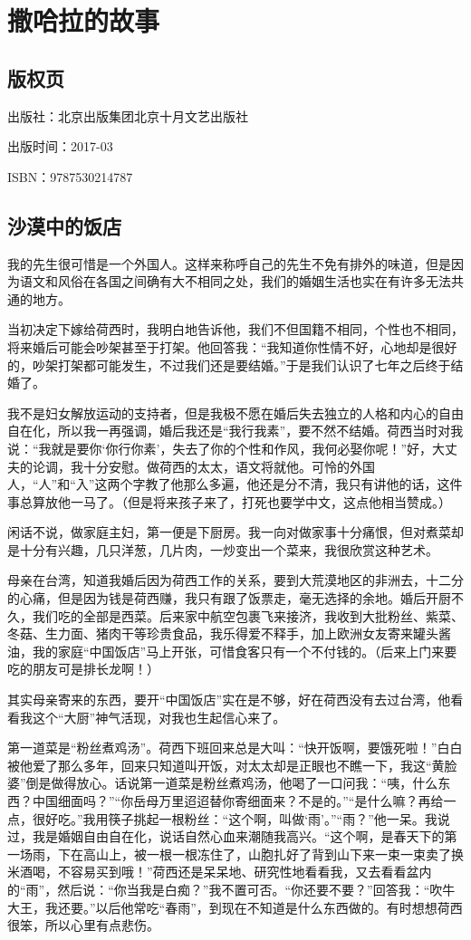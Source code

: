 
\section{撒哈拉的故事}

\subsection{版权页}
\par 出版社：北京出版集团北京十月文艺出版社
\par 出版时间：2017-03
\par ISBN：9787530214787

\subsection{沙漠中的饭店}
\par 我的先生很可惜是一个外国人。这样来称呼自己的先生不免有排外的味道，但是因为语文和风俗在各国之间确有大不相同之处，我们的婚姻生活也实在有许多无法共通的地方。
\par 当初决定下嫁给荷西时，我明白地告诉他，我们不但国籍不相同，个性也不相同，将来婚后可能会吵架甚至于打架。他回答我：“我知道你性情不好，心地却是很好的，吵架打架都可能发生，不过我们还是要结婚。”于是我们认识了七年之后终于结婚了。
\par 我不是妇女解放运动的支持者，但是我极不愿在婚后失去独立的人格和内心的自由自在化，所以我一再强调，婚后我还是“我行我素”，要不然不结婚。荷西当时对我说：“我就是要你‘你行你素’，失去了你的个性和作风，我何必娶你呢！”好，大丈夫的论调，我十分安慰。做荷西的太太，语文将就他。可怜的外国人，“人”和“入”这两个字教了他那么多遍，他还是分不清，我只有讲他的话，这件事总算放他一马了。（但是将来孩子来了，打死也要学中文，这点他相当赞成。）
\par 闲话不说，做家庭主妇，第一便是下厨房。我一向对做家事十分痛恨，但对煮菜却是十分有兴趣，几只洋葱，几片肉，一炒变出一个菜来，我很欣赏这种艺术。
\par 母亲在台湾，知道我婚后因为荷西工作的关系，要到大荒漠地区的非洲去，十二分的心痛，但是因为钱是荷西赚，我只有跟了饭票走，毫无选择的余地。婚后开厨不久，我们吃的全部是西菜。后来家中航空包裹飞来接济，我收到大批粉丝、紫菜、冬菇、生力面、猪肉干等珍贵食品，我乐得爱不释手，加上欧洲女友寄来罐头酱油，我的家庭“中国饭店”马上开张，可惜食客只有一个不付钱的。（后来上门来要吃的朋友可是排长龙啊！）
\par 其实母亲寄来的东西，要开“中国饭店”实在是不够，好在荷西没有去过台湾，他看看我这个“大厨”神气活现，对我也生起信心来了。
\par 第一道菜是“粉丝煮鸡汤”。荷西下班回来总是大叫：“快开饭啊，要饿死啦！”白白被他爱了那么多年，回来只知道叫开饭，对太太却是正眼也不瞧一下，我这“黄脸婆”倒是做得放心。话说第一道菜是粉丝煮鸡汤，他喝了一口问我：“咦，什么东西？中国细面吗？”“你岳母万里迢迢替你寄细面来？不是的。”“是什么嘛？再给一点，很好吃。”我用筷子挑起一根粉丝：“这个啊，叫做‘雨’。”“雨？”他一呆。我说过，我是婚姻自由自在化，说话自然心血来潮随我高兴。“这个啊，是春天下的第一场雨，下在高山上，被一根一根冻住了，山胞扎好了背到山下来一束一束卖了换米酒喝，不容易买到哦！”荷西还是呆呆地、研究性地看看我，又去看看盆内的“雨”，然后说：“你当我是白痴？”我不置可否。“你还要不要？”回答我：“吹牛大王，我还要。”以后他常吃“春雨”，到现在不知道是什么东西做的。有时想想荷西很笨，所以心里有点悲伤。
